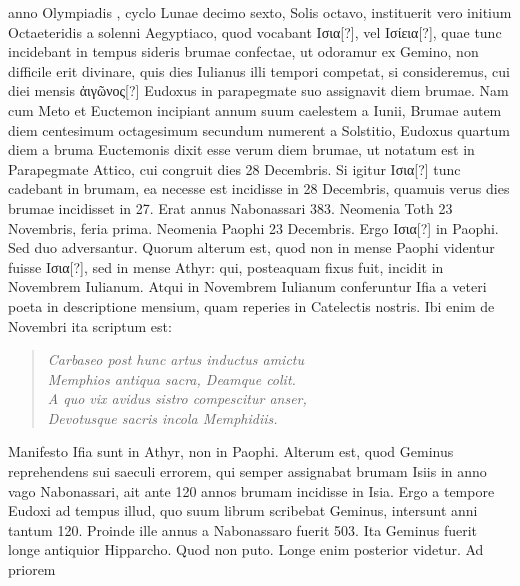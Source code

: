 anno  Olympiadis , cyclo Lunae decimo sexto,
 Solis octavo, instituerit
vero initium Octaeteridis a solenni Aegyptiaco, quod vocabant
\textgreek{Ισια[?]}, vel \textgreek{Ισίεια[?]}, quae tunc incidebant
 in tempus sideris brumae
confectae, ut odoramur ex Gemino, non difficile erit divinare, quis dies
Iulianus illi tempori competat, si consideremus, cui diei mensis
 \textgreek{ἀιγῶνος[?]}
Eudoxus in parapegmate suo assignavit diem brumae.
%
Nam cum
Meto et Euctemon incipiant annum suum caelestem a  Iunii,
Brumae autem diem centesimum octagesimum secundum numerent
a Solstitio, Eudoxus quartum diem a bruma Euctemonis dixit esse verum
diem brumae, ut notatum est in Parapegmate Attico, cui congruit
dies 28 Decembris.
Si igitur \textgreek{Ισια[?]} tunc cadebant in brumam, ea necesse
est incidisse in 28 Decembris, quamuis verus dies brumae incidisset
in 27.
Erat annus Nabonassari 383.
Neomenia Toth 23 Novembris,
feria prima.
Neomenia Paophi 23 Decembris.
Ergo \textgreek{Ισια[?]} in 
Paophi.
Sed duo adversantur.
Quorum alterum est, quod non in mense
Paophi videntur fuisse \textgreek{Ισια[?]}, sed in mense Athyr: qui, posteaquam
fixus fuit, incidit in Novembrem Iulianum.
Atqui in Novembrem
Iulianum conferuntur Ifia a veteri poeta in descriptione mensium, quam
reperies in Catelectis nostris.
Ibi enim de Novembri ita scriptum est:
\begin{verse}
\textit{Carbaseo post hunc artus inductus amictu}\\
\textit{\hspace*{1em}Memphios antiqua sacra, Deamque colit.}\\
\textit{A quo vix avidus sistro compescitur anser,}\\
\textit{\hspace*{1em}Devotusque sacris incola Memphidiis.}
\end{verse}
%
Manifesto Ifia sunt in Athyr, non in Paophi.
Alterum est, quod
Geminus reprehendens sui saeculi errorem, qui semper assignabat brumam
Isiis in anno vago Nabonassari, ait ante 120 annos brumam incidisse
in Isia.
Ergo a tempore Eudoxi ad tempus illud, quo  suum librum
scribebat Geminus, intersunt anni tantum 120.
Proinde ille
annus a Nabonassaro fuerit 503.
Ita Geminus fuerit longe antiquior
Hipparcho.
Quod non puto.
Longe enim posterior videtur.
Ad priorem
